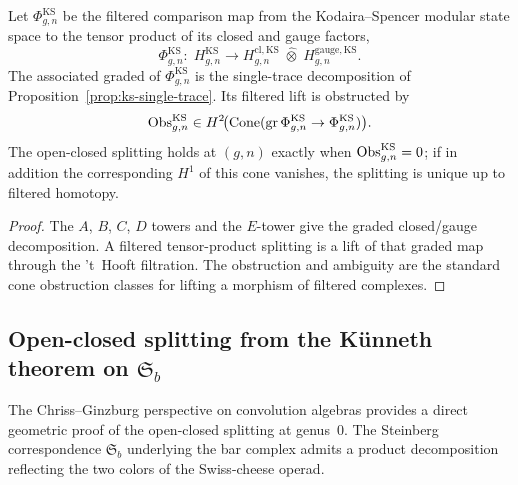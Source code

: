 \begin{proposition}
\label{prop:ks-open-closed-splitting-criterion}
Let $\Phi_{g,n}^{\mathrm{KS}}$ be the filtered comparison map from the Kodaira--Spencer
modular state space to the tensor product of its closed and gauge factors,
\begin{equation}
\label{eq:ks-open-closed-splitting}
\Phi_{g,n}^{\mathrm{KS}}:\;
H_{g,n}^{\mathrm{KS}}
\longrightarrow
H_{g,n}^{\mathrm{cl,KS}}
\;\hat\otimes\;
H_{g,n}^{\mathrm{gauge,KS}} .
\end{equation}
The associated graded of $\Phi_{g,n}^{\mathrm{KS}}$ is the single-trace decomposition of
Proposition~\ref{prop:ks-single-trace}. Its filtered lift is obstructed by
\[
\operatorname{Obs}_{g,n}^{\mathrm{KS}}
\in
H^2\!\bigl(\operatorname{Cone}(\operatorname{gr}\Phi_{g,n}^{\mathrm{KS}}\to \Phi_{g,n}^{\mathrm{KS}})\bigr).
\]
The open-closed splitting holds at $(g,n)$ exactly when
$\operatorname{Obs}_{g,n}^{\mathrm{KS}}=0$; if in addition the corresponding $H^1$ of this cone vanishes,
the splitting is unique up to filtered homotopy.
\end{proposition}

\begin{proof}
The $A$, $B$, $C$, $D$ towers and the $E$-tower give the graded closed/gauge decomposition.
A filtered tensor-product splitting is a lift of that graded map through the 't~Hooft
filtration. The obstruction and ambiguity are the standard cone obstruction classes for
lifting a morphism of filtered complexes.
\end{proof}

\subsection{Open-closed splitting from the K\"unneth theorem on \texorpdfstring{$\mathfrak{S}_b$}{Sb}}
\label{subsec:open-closed-kunneth}

The Chriss--Ginzburg perspective on convolution algebras
provides a direct geometric proof of the open-closed splitting at genus~$0$.
The Steinberg correspondence
$\mathfrak{S}_b$ underlying the bar complex admits a product decomposition
reflecting the two colors of the Swiss-cheese operad.

